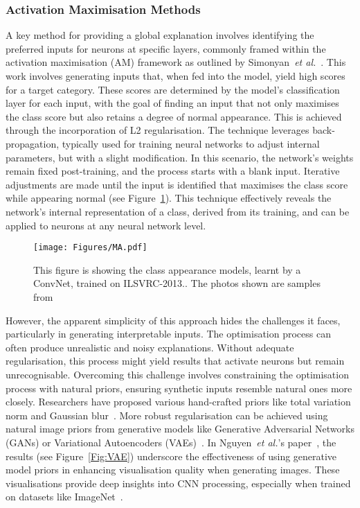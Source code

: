 \subsubsection{Activation Maximisation Methods}

A key method for providing a global explanation involves identifying the preferred inputs for neurons at specific layers, commonly framed within the activation maximisation (AM) framework as outlined by Simonyan~\textit{et al.}~\cite{SimonyanVZ13}. This work involves generating inputs that, when fed into the model, yield high scores for a target category. These scores are determined by the model’s classification layer for each input, with the goal of finding an input that not only maximises the class score but also retains a degree of normal appearance. This is achieved through the incorporation of L2 regularisation. The technique leverages back-propagation, typically used for training neural networks to adjust internal parameters, but with a slight modification. In this scenario, the network's weights remain fixed post-training, and the process starts with a blank input. Iterative adjustments are made until the input is identified that maximises the class score while appearing normal (see Figure~\ref{Fig:AM}). This technique effectively reveals the network's internal representation of a class, derived from its training, and can be applied to neurons at any neural network level.

\begin{figure}[ht!]
	\begin{center}
		\texttt{[image: Figures/MA.pdf]}
	\end{center}
	\caption{This figure is showing the class appearance models, learnt by a ConvNet, trained on ILSVRC-2013.. The photos shown are samples from~\cite{SimonyanVZ13}}
	\label{Fig:AM}
\end{figure} 

However, the apparent simplicity of this approach hides the challenges it faces, particularly in generating interpretable inputs. The optimisation process can often produce unrealistic and noisy explanations. Without adequate regularisation, this process might yield results that activate neurons but remain unrecognisable. Overcoming this challenge involves constraining the optimisation process with natural priors, ensuring synthetic inputs resemble natural ones more closely. Researchers have proposed various hand-crafted priors like total variation norm and Gaussian blur~\cite{NguyenDYBC16}. More robust regularisation can be achieved using natural image priors from generative models like Generative Adversarial Networks (GANs) or Variational Autoencoders (VAEs)~\cite{NguyenDYBC16}. In Nguyen~\textit{et al.}'s paper~\cite{NguyenDYBC16}, the results (see Figure~\ref{Fig:VAE}) underscore the effectiveness of using generative model priors in enhancing visualisation quality when generating images. These visualisations provide deep insights into CNN processing, especially when trained on datasets like ImageNet~\cite{deng2009imagenet}.

